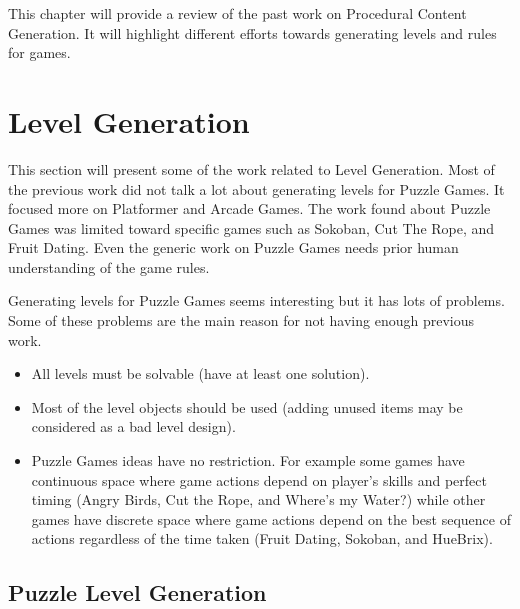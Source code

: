 This chapter will provide a review of the past work on Procedural Content Generation. It will highlight different efforts towards generating levels and rules for games.

\section{Level Generation}
This section will present some of the work related to Level Generation. Most of the previous work did not talk a lot about generating levels for Puzzle Games. It focused more on Platformer and Arcade Games. The work found about Puzzle Games was limited toward specific games such as Sokoban\cite{sokobanLevelGenerationNew, sokobanLevelGenerationOld}, Cut The Rope\cite{ctrSimulationApproach}, and Fruit Dating\cite{fruitDatingPCG}. Even the generic work on Puzzle Games needs prior human understanding of the game rules\cite{ctrProgressiveApproach, ctrAutomaticGeneration}.\\\par

Generating levels for Puzzle Games seems interesting but it has lots of problems. Some of these problems are the main reason for not having enough previous work.
\begin{itemize} \itemsep0pt \parskip0pt 
	\item All levels must be solvable (have at least one solution).
	\item Most of the level objects should be used (adding unused items may be considered as a bad level design).
	\item Puzzle Games ideas have no restriction. For example some games have continuous space where game actions depend on player's skills and perfect timing (Angry Birds\cite{angryBirds}, Cut the Rope\cite{cutTheRope}, and Where's my Water?\cite{whereWater}) while other games have discrete space where game actions depend on the best sequence of actions regardless of the time taken (Fruit Dating\cite{fruitDating}, Sokoban\cite{sokoban}, and HueBrix\cite{hueBrix}).
\end{itemize}

\subsection{Puzzle Level Generation}

